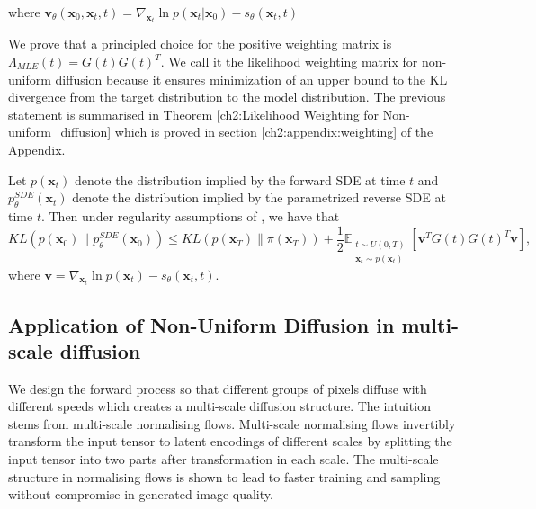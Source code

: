 \noindent where \(\textbf{v}_{\theta}(\textbf{x}_0,\textbf{x}_t,t)=\nabla_{\textbf{x}_t}{\ln{p(\textbf{x}_t | \textbf{x}_0)}} - s_\theta(\textbf{x}_t,t)\)

We prove that a principled choice for the positive weighting matrix is $\Lambda_{MLE}(t)=G(t)G(t)^T$. We call it the likelihood weighting matrix for non-uniform diffusion because it ensures minimization of an upper bound to the KL divergence from the target distribution to the model distribution. The previous statement is summarised in Theorem \ref{ch2:Likelihood Weighting for Non-uniform_diffusion} which is proved in section \ref{ch2:appendix:weighting} of the Appendix.

\begin{theorem}\label{ch2:Likelihood Weighting for Non-uniform_diffusion}
    Let $p(\mathbf{x}_t)$ denote the distribution implied by the forward SDE at time $t$ and $p^{SDE}_\theta(\mathbf{x}_t)$ denote the distribution implied by the parametrized reverse SDE at time $t$. Then under regularity assumptions of \cite[Theorem 1]{song2021maximum}, we have that
    \[
    KL(p(\mathbf{x}_0) \| p^{SDE}_\theta(\mathbf{x}_0)) \leq KL(p(\mathbf{x}_T) \| \pi(\mathbf{x}_T)) + \frac{1}{2} \mathbb{E}_{\substack{t \sim U(0,T) \\ \mathbf{x}_t \sim p(\mathbf{x}_t)}} \left[ \mathbf{v}^T G(t) G(t)^T \mathbf{v} \right],
    \]
    where $\mathbf{v} = \nabla_{\mathbf{x}_t} \ln{p(\mathbf{x}_t)} - s_\theta(\mathbf{x}_t, t)$.
\end{theorem}


\subsection{Application of Non-Uniform Diffusion in multi-scale diffusion} \label{ch2:sec:multi-scale_diffusion}

We design the forward process so that different groups of pixels diffuse with different speeds which creates a multi-scale diffusion structure. The intuition stems from multi-scale normalising flows. Multi-scale normalising flows invertibly transform the input tensor to latent encodings of different scales by splitting the input tensor into two parts after transformation in each scale. The multi-scale structure in normalising flows is shown to lead to faster training and sampling without compromise in generated image quality. %

